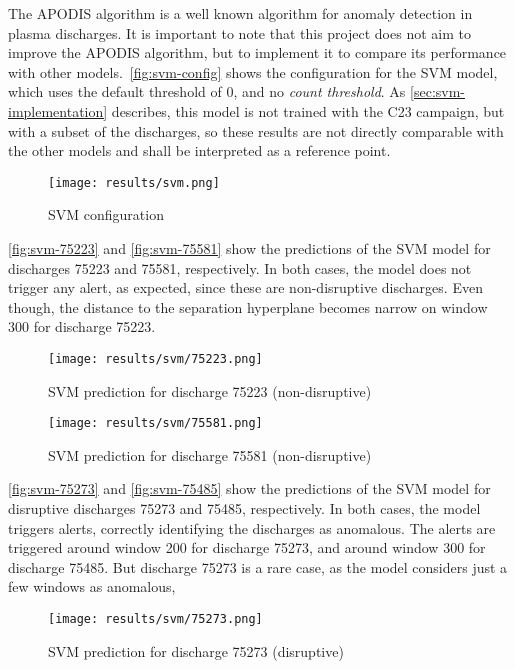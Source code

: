The \ac{APODIS} algorithm is a well known algorithm for anomaly detection in plasma discharges. It is important to note that this project does not aim to improve the \ac{APODIS} algorithm, but to implement it to compare its performance with other models.\ \autoref{fig:svm-config} shows the configuration for the \ac{SVM} model, which uses the default threshold of 0, and no \textit{count threshold}. As \autoref{sec:svm-implementation} describes, this model is not trained with the C23 campaign, but with a subset of the discharges, so these results are not directly comparable with the other models and shall be interpreted as a reference point.

\begin{figure}[H]
    \centering
    \texttt{[image: results/svm.png]}
    \caption{SVM configuration}
    \label{fig:svm-config}
\end{figure}

\autoref{fig:svm-75223} and \autoref{fig:svm-75581} show the predictions of the \ac{SVM} model for discharges 75223 and 75581, respectively. In both cases, the model does not trigger any alert, as expected, since these are non-disruptive discharges. Even though, the distance to the separation hyperplane becomes narrow on window 300 for discharge 75223. 

\begin{figure}[H]
    \centering
    \texttt{[image: results/svm/75223.png]}
    \caption{SVM prediction for discharge 75223 (non-disruptive)}
    \label{fig:svm-75223}
\end{figure}

\begin{figure}[H]
    \centering
    \texttt{[image: results/svm/75581.png]}
    \caption{SVM prediction for discharge 75581 (non-disruptive)}
    \label{fig:svm-75581}
\end{figure}

\autoref{fig:svm-75273} and \autoref{fig:svm-75485} show the predictions of the \ac{SVM} model for disruptive discharges 75273 and 75485, respectively. In both cases, the model triggers alerts, correctly identifying the discharges as anomalous. The alerts are triggered around window 200 for discharge 75273, and around window 300 for discharge 75485. But discharge 75273 is a rare case, as the model considers just a few windows as anomalous, 

\begin{figure}[H]
    \centering
    \texttt{[image: results/svm/75273.png]}
    \caption{SVM prediction for discharge 75273 (disruptive)}
    \label{fig:svm-75273}
\end{figure}

